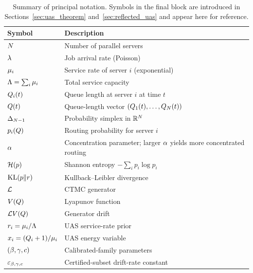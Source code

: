 \begin{table}[htbp]
\centering
\small
\caption{Summary of principal notation. Symbols in the final block are introduced in Sections~\ref{sec:uas_theorem} and~\ref{sec:reflected_uas} and appear here for reference.}
\label{tab:notation}
\renewcommand{\arraystretch}{1.30}
\begin{tabularx}{\linewidth}{@{\hspace{6pt}}l @{\hspace{14pt}} >{\raggedright\arraybackslash}X@{\hspace{6pt}}}
\toprule
\textbf{Symbol} & \textbf{Description} \\
\midrule
$N$ & Number of parallel servers \\
$\lambda$ & Job arrival rate (Poisson) \\
$\mu_i$ & Service rate of server $i$ (exponential) \\
$\Lambda = \sum_i \mu_i$ & Total service capacity \\
\addlinespace[3pt]
$Q_{i}(t)$ & Queue length at server $i$ at time $t$ \\
$Q(t)$ & Queue-length vector $(Q_{1}(t), \dots, Q_{N}(t))$ \\
$\Delta_{N-1}$ & Probability simplex in $\mathbb{R}^N$ \\
$p_{i}(Q)$ & Routing probability for server $i$ \\
\addlinespace[3pt]
$\alpha$ & Concentration parameter; larger $\alpha$ yields more concentrated routing \\
$\mathcal{H}(p)$ & Shannon entropy $-\sum_i p_i \log p_i$ \\
$\mathrm{KL}(p\|r)$ & Kullback--Leibler divergence \\
\addlinespace[3pt]
$\mathcal{L}$ & CTMC generator \\
$V(Q)$ & Lyapunov function \\
$\mathcal{L} V(Q)$ & Generator drift \\
\addlinespace[3pt]
$r_{i} = \mu_i / \Lambda$ & UAS service-rate prior \\
$x_{i} = (Q_{i}+1)/\mu_i$ & UAS energy variable \\
$(\beta, \gamma, c)$ & Calibrated-family parameters \\
$\varepsilon_{\beta,\gamma,c}$ & Certified-subset drift-rate constant \\
\bottomrule
\end{tabularx}
\end{table}
